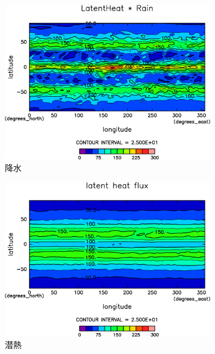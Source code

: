 \documentclass[body]{subfiles}
\begin{document}
\begin{figure}[t]
\begin{subfigure}{.4\textwidth}
		\includegraphics[width=\textwidth]{S1500/Rain,time=3650:4015-crop-rotate.pdf}
		\caption{降水\hmu*{[W/m^{-2}]}}\label{S1500降水}
	\end{subfigure}
	\begin{subfigure}{.4\textwidth}
		\centering
		\includegraphics[width=\textwidth]{S1500/Evap,time=3650:4015-crop-rotate.pdf}
		\caption{潜熱\hmu*{[W/m^{-2}]}}\label{S1500潜熱}
	\end{subfigure}
	\begin{subfigure}{.4\textwidth}
		\centering

\end{subfigure}
\end{figure}
\end{document}
